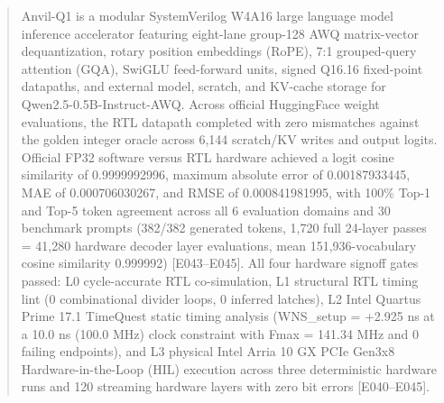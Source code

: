\documentclass[11pt,a4paper]{article}
\begin{document}
\renewcommand{\abstractname}{\textcolor{vulcanblue}{Abstract}}\begin{abstract}\noindent Anvil-Q1 is a modular SystemVerilog W4A16 large language model inference accelerator featuring eight-lane group-128 AWQ matrix-vector dequantization,\allowbreak{} rotary position embeddings (\allowbreak{}RoPE)\allowbreak{},\allowbreak{} 7:1 grouped-query attention (\allowbreak{}GQA)\allowbreak{},\allowbreak{} SwiGLU feed-forward units,\allowbreak{} signed Q16.16 fixed-point datapaths,\allowbreak{} and external model,\allowbreak{} scratch,\allowbreak{} and KV-cache storage for Qwen2.5-0.5B-Instruct-AWQ. Across official HuggingFace weight evaluations,\allowbreak{} the RTL datapath completed with zero mismatches against the golden integer oracle across 6,\allowbreak{}144 scratch/\allowbreak{}KV writes and output logits. Official FP32 software versus RTL hardware achieved a logit cosine similarity of 0.9999992996,\allowbreak{} maximum absolute error of 0.00187933445,\allowbreak{} MAE of 0.000706030267,\allowbreak{} and RMSE of 0.000841981995,\allowbreak{} with 100\% Top-1 and Top-5 token agreement across all 6 evaluation domains and 30 benchmark prompts (\allowbreak{}382/\allowbreak{}382 generated tokens,\allowbreak{} 1,\allowbreak{}720 full 24-layer passes =\allowbreak{} 41,\allowbreak{}280 hardware decoder layer evaluations,\allowbreak{} mean 151,\allowbreak{}936-vocabulary cosine similarity 0.999992)\allowbreak{} [\allowbreak{}E043–E045]\allowbreak{}. All four hardware signoff gates passed: L0 cycle-accurate RTL co-simulation,\allowbreak{} L1 structural RTL timing lint (\allowbreak{}0 combinational divider loops,\allowbreak{} 0 inferred latches)\allowbreak{},\allowbreak{} L2 Intel Quartus Prime 17.1 TimeQuest static timing analysis (\allowbreak{}WNS\_\allowbreak{}setup =\allowbreak{} +\allowbreak{}2.925 ns at a 10.0 ns (\allowbreak{}100.0 MHz)\allowbreak{} clock constraint with Fmax =\allowbreak{} 141.34 MHz and 0 failing endpoints)\allowbreak{},\allowbreak{} and L3 physical Intel Arria 10 GX PCIe Gen3x8 Hardware-in-the-Loop (\allowbreak{}HIL)\allowbreak{} execution across three deterministic hardware runs and 120 streaming hardware layers with zero bit errors [\allowbreak{}E040–E045]\allowbreak{}.\par{}\end{abstract}\vspace{2pt}
\end{document}
